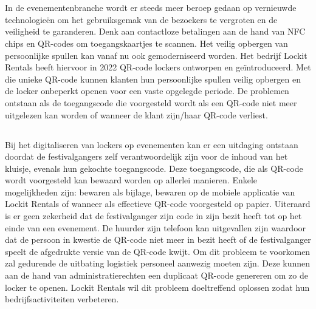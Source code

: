 
\chapter{}%
\label{ch:inleiding}

In de evenementenbranche wordt er steeds meer beroep gedaan op vernieuwde technologieën om het gebruiksgemak van de bezoekers te vergroten en de veiligheid te garanderen. Denk aan contactloze betalingen aan de hand van \ac{NFC} chips en QR-codes om toegangskaartjes te scannen. Het veilig opbergen van persoonlijke spullen kan vanaf nu ook gemoderniseerd worden. Het bedrijf Lockit Rentals heeft hiervoor in 2022 QR-code lockers ontworpen en geïntroduceerd. Met die unieke QR-code kunnen klanten hun persoonlijke spullen veilig opbergen en de locker onbeperkt openen voor een vaste opgelegde periode. De problemen ontstaan als de toegangscode die voorgesteld wordt als een QR-code niet meer uitgelezen kan worden of wanneer de klant zijn/haar QR-code verliest.

\newpage

\section{}%
\label{sec:probleemstelling}

Bij het digitaliseren van lockers op evenementen kan er een uitdaging ontstaan doordat de festivalgangers zelf verantwoordelijk zijn voor de inhoud van het kluisje, evenals hun gekochte toegangscode. Deze toegangscode, die als QR-code wordt voorgesteld kan bewaard worden op allerlei manieren. Enkele mogelijkheden zijn: bewaren als bijlage, bewaren op de mobiele applicatie van Lockit Rentals of wanneer als effectieve QR-code voorgesteld op papier. Uiteraard is er geen zekerheid dat de festivalganger zijn code in zijn bezit heeft tot op het einde van een evenement. De huurder zijn telefoon kan uitgevallen zijn waardoor dat de persoon in kwestie de QR-code niet meer in bezit heeft of de festivalganger speelt de afgedrukte versie van de QR-code kwijt. Om dit probleem te voorkomen zal gedurende de uitbating logistiek personeel aanwezig moeten zijn. Deze kunnen aan de hand van administratierechten een duplicaat QR-code genereren om zo de locker te openen. Lockit Rentals wil dit probleem doeltreffend oplossen zodat hun bedrijfsactiviteiten verbeteren. \newline 

